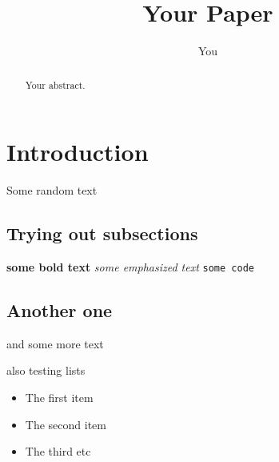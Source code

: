 \documentclass[12pt]{article}
\title{Your Paper}
\author{You}
\begin{document}
\maketitle

\begin{abstract}
Your abstract.
\end{abstract}

\section{Introduction}
Some random text
\subsection{Trying out subsections}

\textbf{some bold text} \newline
\emph{some emphasized text} \newline
\texttt{some code}

\subsection{Another one}
and some more text \newline

also testing lists
\begin{itemize} 
	\item The first item 
	\item The second item 
	\item The third etc 
\end{itemize}
\end{document}

